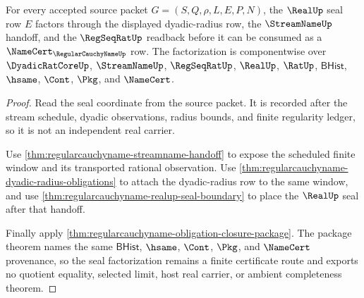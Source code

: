 \begin{theorem}
\label{thm:regularcauchyname-real-seal-factorization}
For every accepted source packet $G=(S,Q,\rho,L,E,P,N)$, the $\RealUp$ seal row $E$ factors through the displayed dyadic-radius row, the $\StreamNameUp$ handoff, and the $\RegSeqRatUp$ readback before it can be consumed as a $\NameCert_{\RegularCauchyNameUp}$ row. The factorization is componentwise over $\DyadicRatCoreUp$, $\StreamNameUp$, $\RegSeqRatUp$, $\RealUp$, $\RatUp$, $\mathsf{BHist}$, $\hsame$, $\Cont$, $\Pkg$, and $\NameCert$.
\end{theorem}
\begin{proof}
Read the seal coordinate from the source packet. It is recorded after the stream schedule, dyadic observations, radius bounds, and finite regularity ledger, so it is not an independent real carrier.

Use \autoref{thm:regularcauchyname-streamname-handoff} to expose the scheduled finite window and its transported rational observation. Use \autoref{thm:regularcauchyname-dyadic-radius-obligations} to attach the dyadic-radius row to the same window, and use \autoref{thm:regularcauchyname-realup-seal-boundary} to place the $\RealUp$ seal after that handoff.

Finally apply \autoref{thm:regularcauchyname-obligation-closure-package}. The package theorem names the same $\mathsf{BHist}$, $\hsame$, $\Cont$, $\Pkg$, and $\NameCert$ provenance, so the seal factorization remains a finite certificate route and exports no quotient equality, selected limit, host real carrier, or ambient completeness theorem.
\end{proof}

